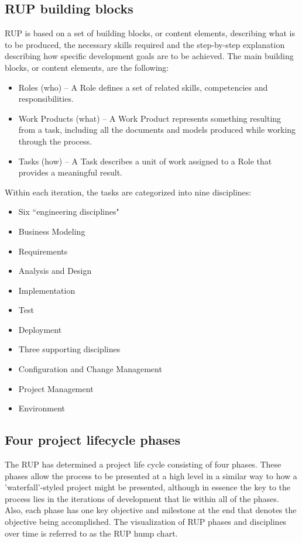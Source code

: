 \subsection{RUP building blocks}

RUP is based on a set of building blocks, or content elements, describing what is to be produced, the necessary skills required and the step-by-step explanation describing how specific development goals are to be achieved. The main building blocks, or content elements, are the following:
\begin{itemize}
\item Roles (who) – A Role defines a set of related skills, competencies and responsibilities.
\item Work Products (what) – A Work Product represents something resulting from a task, including all the documents and models produced while working through the process.
\item Tasks (how) – A Task describes a unit of work assigned to a Role that provides a meaningful result.
\end{itemize}
Within each iteration, the tasks are categorized into nine disciplines:
\begin{itemize}
\item Six ``engineering disciplines"
\item Business Modeling
\item Requirements
\item Analysis and Design
\item Implementation
\item Test
\item Deployment
\item Three supporting disciplines
\item Configuration and Change Management
\item Project Management
\item Environment
\end{itemize}

\subsection{Four project lifecycle phases}

The RUP has determined a project life cycle consisting of four phases. These phases allow the process to be presented at a high level in a similar way to how a 'waterfall'-styled project might be presented, although in essence the key to the process lies in the iterations of development that lie within all of the phases. Also, each phase has one key objective and milestone at the end that denotes the objective being accomplished. The visualization of RUP phases and disciplines over time is referred to as the RUP hump chart.

